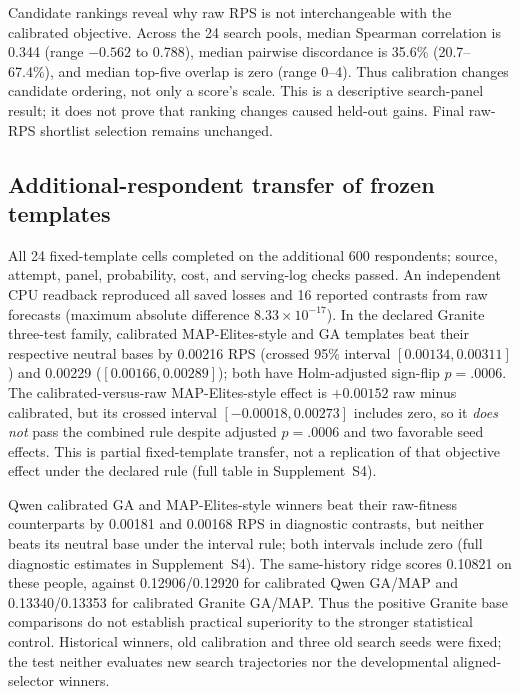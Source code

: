 \documentclass[10pt,twocolumn]{article}
\newcommand{\ArchivalApp}{Supplement~S4}
\begin{document}
Candidate rankings reveal why raw RPS is not interchangeable with the
calibrated objective. Across the 24 search pools, median Spearman correlation
is 0.344 (range $-0.562$ to 0.788), median pairwise discordance is 35.6\%
(20.7--67.4\%), and median top-five overlap is zero (range 0--4). Thus
calibration changes candidate ordering, not only a score's scale. This is a
descriptive search-panel result; it does not prove that ranking changes
caused held-out gains. Final raw-RPS shortlist selection remains unchanged.

\subsection{Additional-respondent transfer of frozen templates}
All 24 fixed-template cells completed on the additional 600 respondents;
source, attempt, panel, probability, cost, and serving-log checks passed.
An independent CPU readback reproduced all saved losses and 16 reported
contrasts from raw forecasts (maximum absolute difference $8.33\times10^{-17}$).
In the declared Granite three-test family, calibrated MAP-Elites-style and GA
templates beat their respective neutral bases by 0.00216 RPS (crossed 95\%
interval $[0.00134,0.00311]$) and 0.00229 ($[0.00166,0.00289]$); both have
Holm-adjusted sign-flip $p=.0006$. The calibrated-versus-raw MAP-Elites-style
effect is $+0.00152$ raw minus calibrated, but its crossed interval
$[-0.00018,0.00273]$ includes zero, so it \emph{does not} pass the combined
rule despite adjusted $p=.0006$ and two favorable seed effects. This is
partial fixed-template transfer, not a replication of that objective effect
under the declared rule (full table in \ArchivalApp).

Qwen calibrated GA and MAP-Elites-style winners beat their raw-fitness
counterparts by 0.00181 and 0.00168 RPS in diagnostic contrasts, but neither
beats its neutral base under the interval rule; both intervals include zero
(full diagnostic estimates in \ArchivalApp). The same-history
ridge scores 0.10821 on these people, against 0.12906/0.12920 for calibrated
Qwen GA/MAP and 0.13340/0.13353 for calibrated Granite GA/MAP. Thus the
positive Granite base comparisons do not establish practical superiority to
the stronger statistical control. Historical winners, old calibration and
three old search seeds were fixed; the test neither evaluates new search
trajectories nor the developmental aligned-selector winners.
\end{document}

